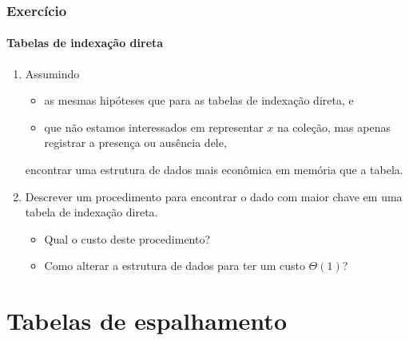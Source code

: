 \documentclass{beamer}
\begin{document}
\begin{frame}

  \frametitle{Exercício}
  \framesubtitle{Tabelas de indexação direta}

  \begin{enumerate}
    \item Assumindo 
      \begin{itemize}
      \item as mesmas hipóteses que para as tabelas de indexação
        direta, e 
      \item que não estamos interessados em representar $x$ na
      coleção, mas apenas registrar a presença ou ausência dele, 
      \end{itemize}
      encontrar uma estrutura de dados mais econômica em memória que
      a tabela.

    \item Descrever um procedimento para encontrar o dado com maior chave
      em uma tabela de indexação direta.
      \begin{itemize}
        \item Qual o custo deste procedimento?
        \item Como alterar a estrutura de dados para ter um custo $\Theta(1)$?
      \end{itemize}
  \end{enumerate}

\end{frame}

\section{Tabelas de espalhamento}
\end{document}
